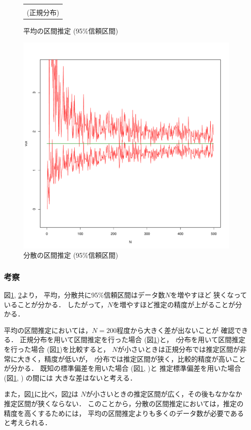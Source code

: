 \documentclass{jsarticle}
\begin{document}
\begin{figure}[b]
\begin{minipage}{\hsize}
\begin{tabular}{c}
\begin{minipage}{0.25\hsize}
				\subcaption{推定標準偏差使用\\(正規分布)}
				\label{img:sdun}
			\end{minipage}
		\end{tabular}
		\caption{平均の区間推定 (95\%信頼区間)}
		\label{img:estimate-mean}
	\end{minipage}
\end{figure}

\begin{figure}[b]
	\centering
	\includegraphics[width=.25\hsize]{img/vux-500.pdf}
	\caption{分散の区間推定 (95\%信頼区間)}
	\label{img:estimate-variance}
\end{figure}

\subsubsection*{考察}
図\ref{img:estimate-mean}, \ref{img:estimate-variance}より，
平均，分散共に95\%信頼区間はデータ数$N$を増やすほど
狭くなっていることが分かる．
したがって，$N$を増やすほど推定の精度が上がることが分かる．

平均の区間推定においては，$N=200$程度から大きく差が出ないことが
確認できる．
正規分布を用いて区間推定を行った場合
(図\ref{img:estimate-mean})と，
\emph{t}分布を用いて区間推定を行った場合
(図\ref{img:estimate-mean})を比較すると，
$N$が小さいときは正規分布では推定区間が非常に大きく，精度が低いが，
\emph{t}分布では推定区間が狭く，比較的精度が高いことが分かる．
既知の標準偏差を用いた場合
(図\ref{img:estimate-mean}, )と
推定標準偏差を用いた場合
(図\ref{img:estimate-mean}, ) の間には
大きな差はないと考える．

また，図\ref{img:estimate-mean}に比べ，図\ref{img:estimate-variance}は
$N$が小さいときの推定区間が広く，その後もなかなか推定区間が狭くならない．
このことから，分散の区間推定においては，推定の精度を高くするためには，
平均の区間推定よりも多くのデータ数が必要であると考えられる．
\end{document}
